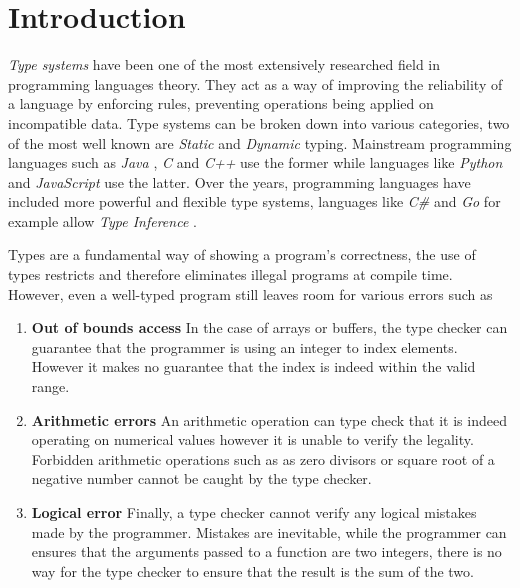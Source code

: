 \documentclass[a4paper,12pt]{report}
\begin{document}
\pagestyle{empty}
\singlespacing

\onehalfspacing

\singlespacing

\singlespacing


\setcounter{page}{0}
\pagestyle{plain}
\tableofcontents
\listoffigures

\onehalfspacing


\chapter{Introduction}
\setcounter{page}{1} 

\textit{Type systems} \cite{typesystem} have been one of the most extensively 
researched field in programming languages theory. They act as a way of 
improving the reliability of a 
language by enforcing rules, preventing operations being applied on 
incompatible data. Type systems can be broken down into various categories, 
two of the most well known are \textit{Static} \cite{staticTyping} and 
\textit{Dynamic} \cite{dynamicTyping} typing. Mainstream programming 
languages such as \textit{Java} \cite{java}, \textit{C} \cite{c} and \textit{C++} \cite{cpp} 
use the former while languages like \textit{Python} \cite{python} and 
\textit{JavaScript} \cite{js} use the latter. 
Over the years, programming languages have included more powerful and flexible 
type systems, languages like \textit{C\#} \cite{cSharp} and \textit{Go} 
\cite{goInferenceType} for example allow \textit{Type Inference} \cite{inferenceType}.

\par
Types are a fundamental way of showing a program's correctness, the use of types 
restricts and therefore eliminates illegal programs at compile time. However, 
even a well-typed program still leaves room for various errors such as 
\begin{enumerate}
  \item {\textbf{Out of bounds access}} In the case of arrays or buffers, the type checker 
  can guarantee that the programmer is using an integer to index elements. 
  However it makes no guarantee that the index is indeed within the valid range. 
  \item {\textbf{Arithmetic errors}} An arithmetic operation can type check that it is 
  indeed operating on numerical values however it is unable to verify the 
  legality. Forbidden arithmetic operations such as as zero divisors or square 
  root of a negative number cannot be caught by the type checker. 
  \item {\textbf{Logical error}} Finally, a type checker cannot verify any logical 
  mistakes made by the programmer. Mistakes are inevitable, while the programmer 
  can ensures that the arguments passed to a function are two integers, there is 
  no way for the type checker to ensure that the result is the sum of the two. 
\end{enumerate}
\end{document}
